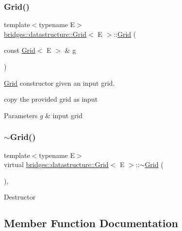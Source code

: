 \subsubsection{\texorpdfstring{Grid()}{Grid()}\hspace{0.1cm}{\footnotesize\ttfamily [4/4]}}
{\footnotesize\ttfamily template$<$typename E$>$ \\
\hyperlink{classbridges_1_1datastructure_1_1_grid}{bridges\+::datastructure\+::\+Grid}$<$ E $>$\+::\hyperlink{classbridges_1_1datastructure_1_1_grid}{Grid} (\begin{DoxyParamCaption}\item[{const \hyperlink{classbridges_1_1datastructure_1_1_grid}{Grid}$<$ E $>$ \&}]{g }\end{DoxyParamCaption})\hspace{0.3cm}{\ttfamily [inline]}}



\hyperlink{classbridges_1_1datastructure_1_1_grid}{Grid} constructor given an input grid. 

copy the provided grid as input 
\begin{DoxyParams}{Parameters}
{\em g} & input grid \\
\hline
\end{DoxyParams}
\mbox{\label{classbridges_1_1datastructure_1_1_grid_aa04b4929a35fa359dbaab86e46fda204}} 
\subsubsection{\texorpdfstring{$\sim$\+Grid()}{~Grid()}}
{\footnotesize\ttfamily template$<$typename E$>$ \\
virtual \hyperlink{classbridges_1_1datastructure_1_1_grid}{bridges\+::datastructure\+::\+Grid}$<$ E $>$\+::$\sim$\hyperlink{classbridges_1_1datastructure_1_1_grid}{Grid} (\begin{DoxyParamCaption}{ }\end{DoxyParamCaption})\hspace{0.3cm}{\ttfamily [inline]}, {\ttfamily [virtual]}}

Destructor 

\subsection{Member Function Documentation}
\mbox{\label{classbridges_1_1datastructure_1_1_grid_a1ff40a322e0c6407affb608366f895b6}} 
